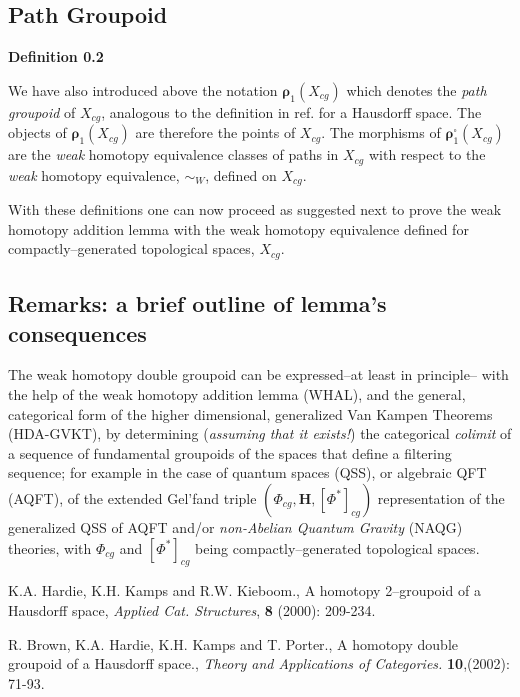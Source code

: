 \documentclass[12pt]{article}
\theoremstyle{plain}
\theoremstyle{definition}
\numberwithin{equation}{section}
\begin{document}
\subsection{Path Groupoid}

 \textbf{Definition 0.2}  

We have also introduced above the notation $\boldsymbol{\rho}_1 (X _{cg})$ which denotes the \emph{path 
groupoid} of $X _{cg}$, analogous to the definition in ref. \cite{HKK} for a Hausdorff space. 
The objects of $\boldsymbol{\rho}_1 (X _{cg}) $ are therefore the points of $X _{cg}$. 
The morphisms of $\boldsymbol{\rho}^\square_1 (X _{cg})$ are the \emph{weak} homotopy equivalence classes of paths in 
$X _{cg}$ with respect to the \emph{weak} homotopy equivalence, $\sim _W$, defined on $X _{cg}$.

    With these definitions one can now proceed as suggested next to prove the weak homotopy addition lemma with the weak homotopy equivalence defined for compactly--generated topological spaces, $X _{cg}$.

\subsection{Remarks: a brief outline of lemma's consequences}

The weak homotopy double groupoid can be expressed--at least in principle-- with the help of the 
weak homotopy addition lemma (WHAL), and the general, categorical form of the higher dimensional, generalized Van Kampen Theorems (HDA-GVKT), by determining (\emph{assuming that it exists!}) the categorical \emph{colimit} of a sequence of fundamental groupoids of the spaces that define a filtering sequence; for example in the case of quantum spaces (QSS), or algebraic QFT (AQFT), of the extended Gel'fand triple $(\Phi_{cg}, \textbf{H}, [\Phi^*]_{cg})$ representation of the generalized QSS of AQFT and/or \emph{non-Abelian Quantum Gravity} (NAQG) theories, with $\Phi_{cg}$ and $[\Phi^*]_{cg}$ being compactly--generated topological spaces.  


\begin{thebibliography}{9}

K.A. Hardie, K.H. Kamps and R.W. Kieboom., A homotopy 2--groupoid of a Hausdorff space,
\emph{Applied Cat. Structures}, \textbf{8} (2000): 209-234.

R. Brown, K.A. Hardie, K.H. Kamps  and T. Porter., A homotopy double groupoid of a Hausdorff %
space., {\it Theory and Applications of Categories.} \textbf{10},(2002): 71-93.

\end{thebibliography}
\end{document}
